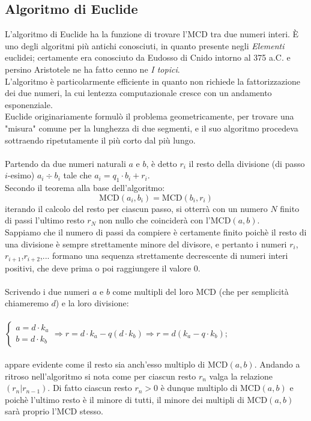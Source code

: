\documentclass[a4paper,12pt]{article}
\begin{document}
\subsection{Algoritmo di Euclide}
L'algoritmo di Euclide ha la funzione di trovare l'MCD tra due numeri interi. È uno degli algoritmi più antichi conosciuti, in quanto presente negli \emph{Elementi} euclidei; certamente era conosciuto da Eudosso di Cnido intorno al 375 a.C. e persino Aristotele ne ha fatto cenno ne \emph{I topici}.\\
L'algoritmo è particolarmente efficiente in quanto non richiede la fattorizzazione dei due numeri, la cui lentezza computazionale cresce con un andamento esponenziale.\\
Euclide originariamente formulò il problema geometricamente, per trovare una "misura" comune per la lunghezza di due segmenti, e il suo algoritmo procedeva sottraendo ripetutamente il più corto dal più lungo.\\\\
Partendo da due numeri naturali $a$ e $b$, è detto $r_i$ il resto della divisione (di passo $i$-esimo) $a_i \div b_i$ tale che $a_i=q_1\cdot b_i+r_i$. \\
Secondo il teorema alla base dell'algoritmo:
\begin{equation}
    \text{MCD}(a_i,b_i)= \text{MCD}(b_i,r_i)
\end{equation}
iterando il calcolo del resto per ciascun passo, si otterrà con un numero $N$ finito di passi l'ultimo resto $r_N$ non nullo che coinciderà con l'MCD$(a,b)$.\\
Sappiamo che il numero di passi da compiere è certamente finito poichè il resto di una divisione è sempre strettamente minore del divisore, e pertanto i numeri
$r_i$,$r_{i+1}$,$r_{i+2}$,... formano una sequenza strettamente decrescente di numeri interi positivi, che deve
prima o poi raggiungere il valore 0.\\\\
Scrivendo i due numeri $a$ e $b$ come multipli del loro MCD (che per semplicità chiameremo $d$) e la loro divisione:\\\\
$\left \{ \begin{array}{rl}
a=d \cdot k_a
\\b=d \cdot k_b
\end{array}
\right. \Rightarrow r=d \cdot k_a - q (d \cdot k_b) \Rightarrow r = d (k_a - q \cdot k_b);$\\\\
appare evidente come il resto sia anch'esso multiplo di MCD$(a,b)$. Andando a ritroso nell'algoritmo si nota come per ciascun resto $r_n$ valga la relazione $(r_n|r_{n-1})$. Di fatto ciascun resto $r_n > 0$ è dunque multiplo di MCD$(a,b)$ e poichè l'ultimo resto è il minore di tutti, il minore dei multipli di MCD$(a,b)$ sarà proprio l'MCD stesso.
\end{document}
